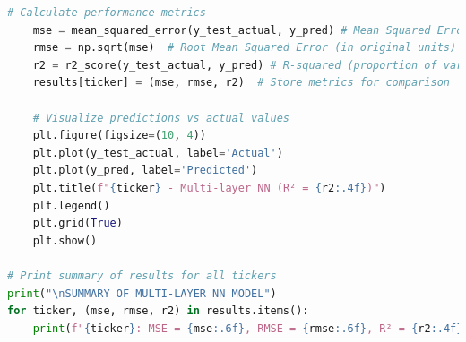 \documentclass[12pt]{article}
\begin{document}
\begin{lstlisting}[language=Python]
    # Calculate performance metrics
    mse = mean_squared_error(y_test_actual, y_pred) # Mean Squared Error
    rmse = np.sqrt(mse)  # Root Mean Squared Error (in original units)
    r2 = r2_score(y_test_actual, y_pred) # R-squared (proportion of variance explained)
    results[ticker] = (mse, rmse, r2)  # Store metrics for comparison

    # Visualize predictions vs actual values
    plt.figure(figsize=(10, 4))
    plt.plot(y_test_actual, label='Actual')
    plt.plot(y_pred, label='Predicted')
    plt.title(f"{ticker} - Multi-layer NN (R² = {r2:.4f})")
    plt.legend()
    plt.grid(True)
    plt.show()

# Print summary of results for all tickers
print("\nSUMMARY OF MULTI-LAYER NN MODEL")
for ticker, (mse, rmse, r2) in results.items():
    print(f"{ticker}: MSE = {mse:.6f}, RMSE = {rmse:.6f}, R² = {r2:.4f}")
\end{lstlisting}
\end{document}
